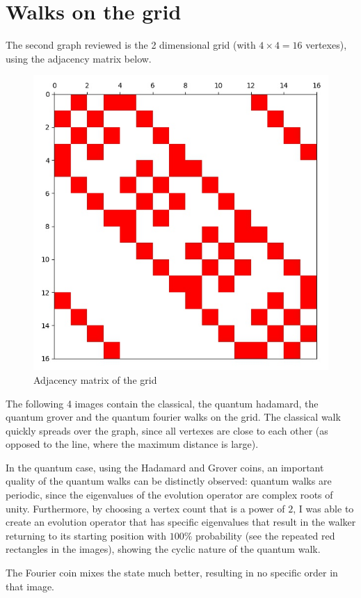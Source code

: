 \section{Walks on the grid}

The second graph reviewed is the 2 dimensional grid (with $4\times{}4=16$ vertexes), using the adjacency matrix below.

\begin{figure}[H]
\centering
\includegraphics[width=0.5\linewidth]{./figures/results/grid/graph.jpg}
\caption{Adjacency matrix of the grid}
\end{figure}

The following 4 images contain the classical, the quantum hadamard, the quantum grover and the quantum fourier walks on the grid. The classical walk quickly spreads over the graph, since all vertexes are close to each other (as opposed to the line, where the maximum distance is large).

In the quantum case, using the Hadamard and Grover coins, an important quality of the quantum walks can be distinctly observed: quantum walks are periodic, since the eigenvalues of the evolution operator are complex roots of unity. Furthermore, by choosing a vertex count that is a power of $2$, I was able to create an evolution operator that has specific eigenvalues that result in the walker returning to its starting position
with $100\%$ probability (see the repeated red rectangles in the images), showing the cyclic nature of the quantum walk.

The Fourier coin mixes the state much better, resulting in no specific order in that image.

